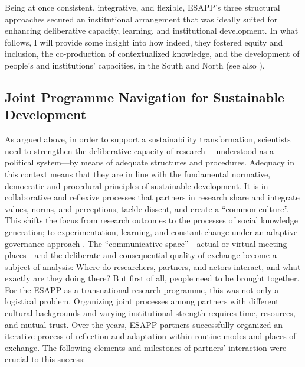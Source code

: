 \documentclass[10pt,a4paper]{article}
\begin{document}
\begin{multicols}{2}
Being at once consistent, integrative, and flexible, ESAPP's three structural approaches secured an institutional arrangement that was ideally suited for enhancing deliberative capacity, learning, and institutional development. In what follows, I will provide some insight into how indeed, they fostered equity and inclusion, the co-production of contextualized knowledge, and the development of people's and institutions' capacities, in the South and North (see also \citep{r59}).

\subsection{Joint Programme Navigation for Sustainable Development}
\noindent As argued above, in order to support a sustainability transformation, scientists need to strengthen the deliberative capacity of research--- understood as a political system---by means of adequate structures and procedures. Adequacy in this context means that they are in line with the fundamental normative, democratic and procedural principles of sustainable development. It is in collaborative and reflexive processes that partners in research share and integrate values, norms, and perceptions, tackle dissent, and create a ``common culture''. This shifts the focus from research outcomes to the processes of social knowledge generation; to experimentation, learning, and constant change under an adaptive governance approach \citep{r30, r54, r62}. The ``communicative space''---actual or virtual meeting places---and the deliberate and consequential quality of exchange become a subject of analysis: Where do researchers, partners, and actors interact, and what exactly are they doing there? But first of all, people need to be brought together. For the ESAPP as a transnational research programme, this was not only a logistical problem. Organizing joint processes among partners with different cultural backgrounds and varying institutional strength requires time, resources, and mutual trust. Over the years, ESAPP partners successfully organized an iterative process of reflection and adaptation within routine modes and places of exchange. The following elements and milestones of partners' interaction were crucial to this success: 


\end{multicols}
\end{document}

